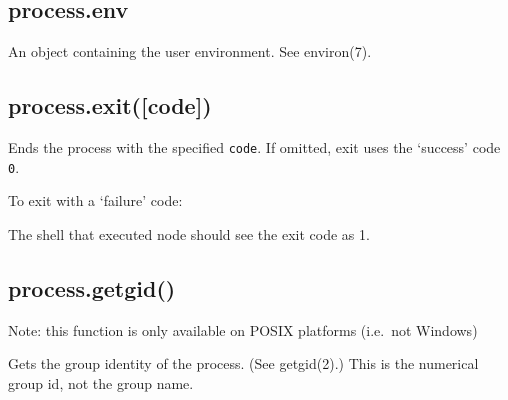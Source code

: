 \begin{Shaded}
\begin{Highlighting}[]
\NormalTok{(} \NormalTok{+ }\NormalTok{());}
\end{Highlighting}
\end{Shaded}

\subsection{process.env}

An object containing the user environment. See environ(7).

\subsection{process.exit({[}code{]})}

Ends the process with the specified \texttt{code}. If omitted, exit uses
the `success' code \texttt{0}.

To exit with a `failure' code:

\begin{Shaded}
\begin{Highlighting}[]
\NormalTok{(}\NormalTok{);}
\end{Highlighting}
\end{Shaded}

The shell that executed node should see the exit code as 1.

\subsection{process.getgid()}

Note: this function is only available on POSIX platforms (i.e.~not
Windows)

Gets the group identity of the process. (See getgid(2).) This is the
numerical group id, not the group name.

\begin{Shaded}
\begin{Highlighting}[]
 \NormalTok{(}\NormalTok{) \{}
  \NormalTok{(} \NormalTok{+ }\NormalTok{());}
\NormalTok{\}}
\end{Highlighting}
\end{Shaded}

